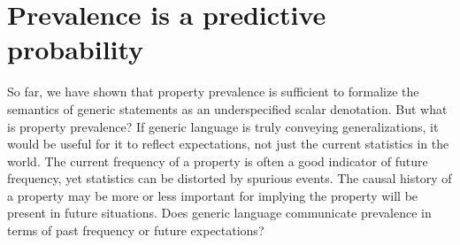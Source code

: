 \documentclass[12pt,letterpaper]{article}
\begin{document}



%

\section*{Prevalence is a predictive probability}

So far, we have shown that property prevalence is sufficient to formalize the semantics of generic statements as an underspecified scalar denotation.
But what is property prevalence?
If generic language is truly conveying generalizations, it would be useful for it to reflect expectations, not just the current statistics in the world.
The current frequency of a property is often a good indicator of future frequency, yet statistics can be distorted by spurious events.
The causal history of a property may be more or less important for implying the property will be present in future situations.
Does generic language communicate prevalence in terms of past frequency or future expectations?
\end{document}
